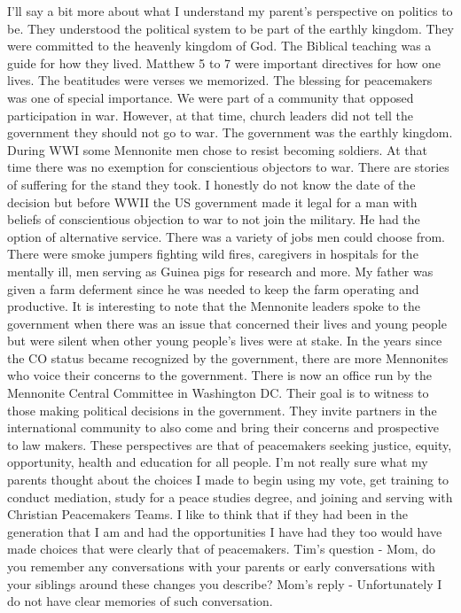 I'll say a bit more about what I understand my parent's perspective on politics to be. They understood the political system to be part of the earthly kingdom. They were committed to the heavenly kingdom of God. The Biblical teaching was a guide for how they lived. Matthew 5 to 7 were important directives for how one lives. The beatitudes were verses we memorized. The blessing for peacemakers was one of special importance. We were part of a community that opposed participation in war. However, at that time, church leaders did not tell the government they should not go to war. The government was the earthly kingdom. During WWI some Mennonite men chose to resist becoming soldiers. At that time there was no exemption for conscientious objectors to war. There are stories of suffering for the stand they took. I honestly do not know the date of the decision but before WWII the US government made it legal for a man with beliefs of conscientious objection to war to not join the military. He had the option of alternative service. There was a variety of jobs men could choose from. There were smoke jumpers fighting wild fires, caregivers in hospitals for the mentally ill, men serving as Guinea pigs for research and more. My father was given a farm deferment since he was needed to keep the farm operating and productive. It is interesting to note that the Mennonite leaders spoke to the government when there was an issue that concerned their lives and young people but were silent when other young people's lives were at stake.
In the years since the CO status became recognized by the government, there are more Mennonites who voice their concerns to the government. There is now an office run by the Mennonite Central Committee in Washington DC. Their goal is to witness to those making political decisions in the government. They invite partners in the international community to also come and bring their concerns and prospective to law makers. These perspectives are that of peacemakers seeking justice, equity, opportunity, health and education for all people. I'm not really sure what my parents thought about the choices I made to begin using my vote, get training to conduct mediation, study for a peace studies degree, and joining and serving with Christian Peacemakers Teams. I like to think that if they had been in the generation that I am and had the opportunities I have had they too would have made choices that were clearly that of peacemakers.
Tim's question - Mom, do you remember any conversations with your parents or early conversations with your siblings around these changes you describe?
Mom's reply - Unfortunately I do not have clear memories of such conversation.






